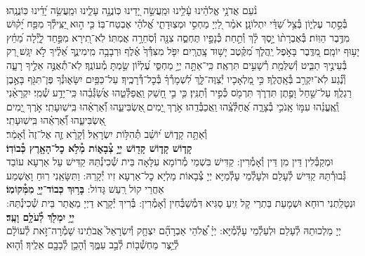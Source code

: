 \documentclass[twoside, openany, parskip=half, 11pt]{book}
\begin{document}
\label{vihi noam}
 \\
נֹ֨עַם אֲדֹנָ֥י אֱלֹהֵ֗ינוּ עָ֫לֵ֥ינוּ וּמַֽעֲשֵׂ֣ה יָ֭דֵינוּ כּֽוֹנֲנָ֣ה עָלֵ֑ינוּ וּמַֽעֲשֵׂ֥ה יָ֝דֵ֗ינוּ כּֽוֹנֲנֵֽהוּ׃\\
בְּ֯סֵ֣תֶר עֶלְי֑וֹן בְּ֯צֵ֥ל שַׁ֝דַּ֗י יִתְלוֹנָֽן׃
אֹמַ֗ר לַ֭יְיָ מַחְסִ֣י וּמְצֽוּדָתִ֑י אֱ֝לֹהַ֗י אֶבְטַח־בּֽוֹ׃
כִּ֤י ה֣וּא יַ֭צִּֽילְ֯ךָ מִפַּ֥ח יָ֝ק֗וּשׁ מִדֶּ֥בֶר הַוּֽוֹת׃
בְּ֯אֶבְרָת֨וֹ יָ֣סֶךְ לָ֗ךְ וְ֯תַ֣חַת כְּ֯נָפָ֣יו תֶּחְסֶ֑ה צִנָּ֖ה וְ֯סֹֽחֵרָ֣ה אֲמִתּֽוֹ׃
לֹֽא־תִ֭ירָא מִפַּ֣חַד לָ֑יְ֯לָה מֵ֝חֵ֗ץ יָע֥וּף יוֹמָֽם׃
מִ֭דֶּֽבֶר בָּאֹ֣פֶל יַֽהֲלֹ֑ךְ מִ֝קֶּ֗טֶב יָשׁ֥וּד צָֽהֳרָֽיִם׃
יִפֹּ֤ל מִצִּדְּ֯ךָ֙ אֶ֗לֶף וּרְבָבָ֥ה מִֽימִינֶ֑ךָ אֵ֝לֶ֗יךָ לֹ֣א יִגָּֽשׁ׃
רַ֭ק בְּ֯עֵינֶ֣יךָ תַבִּ֑יט וְ֯שִׁלֻּמַ֖ת רְ֯שָׁעִ֣ים תִּרְאֶֽה׃
כִּֽי־אַתָּ֣ה יְיָ֣ מַחְסִּ֑י עֶ֝לְי֗וֹן שַׂ֣מְתָּ מְ֯עוֹנֶֽךָ׃
לֹֽא־תְ֯אֻנֶּ֣ה אֵלֶ֣יךָ רָעָ֑ה וְ֯נֶ֗֝גַע לֹֽא־יִקְרַ֥ב בְּ֯אָֽהֳלֶֽךָ׃
כִּ֣י מַ֭לְאָכָיו יְ֯צַוֶּה־לָּ֑ךְ לִ֝שְׁמָרְ֯ךָ֗ בְּ֯כׇל־דְּ֯רָכֶֽיךָ׃
עַל־כַּפַּ֥יִם יִשָּׂא֑וּנְ֯ךָ פֶּן־תִּגֹּ֖ף בָּאֶ֣בֶן רַגְלֶֽךָ׃
עַל־שַׁ֣חַל וָפֶ֣תֶן תִּדְרֹ֑ךְ תִּרְמֹ֖ס כְּ֯פִ֣יר וְ֯תַנִּֽין׃
כִּ֤י בִ֣י חָ֭שַׁק וַֽאֲפַלְּ֯טֵ֑הוּ אֲשַׂ֝גְּ֯בֵ֗הוּ כִּֽי־יָדַ֥ע שְׁ֯מִֽי׃
יִקְרָאֵ֨נִי וְֽ֯אֶֽעֱנֵ֗הוּ עִמּ֣וֹ אָֽנֹכִ֣י בְ֯צָרָ֑ה אֲ֝חַלְּ֯צֵֽ֗הוּ וַֽאֲכַבְּ֯דֵֽהוּ׃
אֹ֣רֶךְ יָ֭מִים ֖אַשְׂבִּיעֵ֑הוּ וְ֝֯אַרְאֵ֗הוּ בִּֽישֽׁוּעָתִֽי׃
אֹ֣רֶךְ יָ֭מִים ֖אַשְׂבִּיעֵ֑הוּ וְ֝֯אַרְאֵ֗הוּ בִּֽישֽׁוּעָתִֽי׃\\
\label{v ata kadosh}
וְ֯אַתָּ֥ה
%
קָד֑וֹשׁ י֝וֹשֵׁ֗ב תְּ֯הִלּ֥וֹת יִשְׂרָאֵֽל׃
%
וְ֯קָרָ֨א זֶ֤ה אֶל־זֶה֙ וְ֯אָמַ֔ר׃\\
\textbf{קָד֧וֹשׁ קָד֛וֹשׁ קָד֖וֹשׁ יְיָ֣ צְ֯בָא֑וֹת מְ֯לֹ֥א כׇל־הָאָ֖רֶץ כְּ֯בוֹדֽוֹ׃}\\
וּמְקַבְּ֯לִין דֵּין מִן דֵּין וְ֯אָמְ֯רִין: קַדִּישׁ בִּשְׁמֵי מְ֯רוֹמָא עִלָּאָה בֵּית שְׁ֯כִינְ֯תֵּהּ קַדִּישׁ עַל אַרְעָא עוֹבַד גְּ֯בוּרְ֯תֵּהּ קַדִּישׁ לְ֯עָלַם וּלְעָלְ֯מֵי עָלְ֯מַיָּא יְיָ צְ֯בָאוֹת מַלְיָא כׇל־אַרְעָא זִיו יְ֯קָרֵהּ:  וַתִּשָּׂאֵֽנִי רֽוּחַ וָאֶשְׁמַע אַחֲרַי קוֹל רַֽעַשׁ גָּדוֹל:
\textbf{בָּר֥וּךְ כְּבוֹד־יְיָ֖ מִמְּ֯קוֹמֽוֹ׃} \\
וּנְטָלַֽתְנִי רוּחָא וּשְׁמָעֵת בַּתְרַי קָל זִֽיעַ סַגִּיא דִּמְ֯שַׁבְּ֯חִין וְ֯אָמְ֯רִין: בְּ֯רִיךְ יְ֯קָרָא דַיְיָ מֵאֲתַר בֵּית שְׁ֯כִינְ֯תֵּהּ:
\textbf{יְיָ֥ יִמְלֹ֖ךְ לְ֯עֹלָ֥ם וָעֶֽד׃} \\
יְיָ מַלְכוּתֵהּ לְ֯עָלַם וּלְעַלְ֯מֵי עָלְ֯מְ֯יָּא: יְיָ֗
%
אֱ֠לֹהֵי אַבְרָהָ֞ם יִצְחָ֤ק וְ֯יִשְׂרָאֵל֙ אֲבֹתֵ֔ינוּ שָׁמְ֯רָה־זֹּ֣את לְ֯עוֹלָ֔ם לְ֯יֵ֥צֶר מַחְשְׁ֯ב֖וֹת לְ֯בַ֣ב עַמֶּ֑ךָ וְ֯הָכֵ֥ן לְ֯בָבָ֖ם אֵלֶֽיךָ׃ וְ֯ה֤וּא
\end{document}
